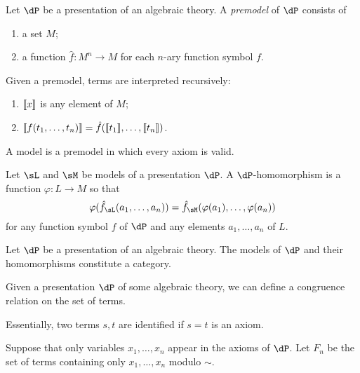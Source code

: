 \documentclass{amsart}
\begin{document}
\begin{defn}
  Let $\dP$ be a presentation of an algebraic theory.
  A \emph{premodel} of $\dP$ consists of
  \begin{enumerate}
  \item a set $M$;
  \item a function $\hat{f} : M^{n} \to M$ for each $n$-ary function symbol $f$.
  \end{enumerate}
\end{defn}

Given a premodel, terms are interpreted recursively:
\begin{enumerate}
\item $\llbracket x \rrbracket$ is any element of $M$;
\item $\llbracket f(t_{1},\ldots,t_{n}) \rrbracket = \hat{f}(\llbracket t_{1} \rrbracket,\ldots,\llbracket t_{n} \rrbracket)$.
\end{enumerate}

A model is a premodel in which every axiom is valid.

\begin{defn}
  Let $\sL$ and $\sM$ be models of a presentation $\dP$.
  A $\dP$-homomorphism is a function $\varphi : L \to M$ so that
  \[
    \varphi(\hat{f}_{\sL}(a_{1},\ldots,a_{n})) = \hat{f}_{\sM}(\varphi(a_{1}),\ldots,\varphi(a_{n}))
  \]
  for any function symbol $f$ of $\dP$ and any elements $a_{1},\ldots,a_{n}$ of $L$.
\end{defn}

\begin{lem}
  Let $\dP$ be a presentation of an algebraic theory.
  The models of $\dP$ and their homomorphisms constitute a category.
\end{lem}

Given a presentation $\dP$ of some algebraic theory, we can define a congruence relation on the set of terms.
Essentially, two terms $s,t$ are identified if $s = t$ is an axiom.

Suppose that only variables $x_{1},\ldots,x_{n}$ appear in the axioms of $\dP$.
Let $F_{n}$ be the set of terms containing only $x_{1},\ldots,x_{n}$ modulo $\sim$.
\end{document}
